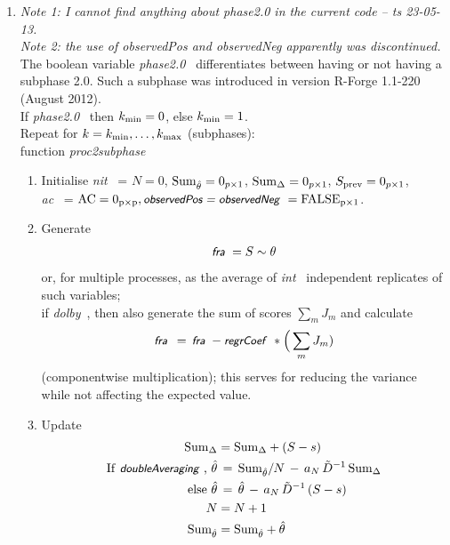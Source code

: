 \documentclass[a4paper,12pt,fleqn]{article}
\newcommand{\nnm}[1]{\textsf{\small\textit{#1}\ }}
\begin{document}
\begin{enumerate}
     In the code, matrix $\hat{D}$ is \nnm{dinv} and $\tilde{D}$ is \nnm{dinvv}.
\item[Phase 2.]
    \emph{Note 1: I cannot find anything about phase2.0 in the current code -- ts 23-05-13.}\\
    \emph{Note 2: the use of observedPos and observedNeg apparently was discontinued.}\\
    The boolean variable \nnm{phase2.0} differentiates between having or not
    having a subphase 2.0.
    Such a subphase was introduced in version R-Forge 1.1-220 (August 2012).\\
    If \nnm{phase2.0} then $k_{\rm{min}} = 0$, else $k_{\rm{min}} = 1$.\\
     Repeat for $k = k_{\rm{min}}, \ldots, k_{\rm{max}}$ (subphases):\\
     function \nnm{proc2subphase}
     \begin{enumerate}
     \item Initialise \nnm{nit} = $N = 0$,
        ${\rm{Sum}}_{\hat\theta} = 0_{p \times 1}$,  ${\rm{Sum}}_\Delta = 0_{p \times 1}$,
        $S_{\rm{prev}} = 0_{p \times 1}$, \\
        \nnm{ac} = $\rm{AC} = 0_{p \times p},
        \nnm{observedPos = observedNeg}  = \text{FALSE}_{p \times 1}$.
     \item Generate
           \[
           \nnm{fra} = S \sim \theta
           \]
           or, for multiple processes, as the average of \nnm{int}
           independent replicates of such variables;\\
           if \nnm{dolby}, then also generate the sum of scores $\sum_m J_m$
           and calculate
           \[
           \nnm{fra} \,=\, \nnm{fra} - \nnm{regrCoef}*\Big(\sum_m J_m)
           \]
           (componentwise multiplication); this serves for reducing the
           variance while not affecting the expected value.
    \item  Update
            \begin{align*}
              {\rm{Sum}}_\Delta & =  {\rm{Sum}}_\Delta + (S-s) \\
             \text{If \nnm{doubleAveraging},}\ \hat{\theta} &\,=\,
               {\rm{Sum}}_{\hat\theta}/N \,-\, a_N\, \tilde{D}^{-1} \, {\rm{Sum}}_\Delta \\
             \text{else}\ \hat{\theta} &\,=\,
               \hat{\theta} \,-\, a_N\, \tilde{D}^{-1} \, (S - s) \\
             N & =  N+1 \\
            {\rm{Sum}}_{\hat\theta} & =  {\rm{Sum}}_{\hat\theta} + \hat\theta \\

\end{align*}
\end{enumerate}
\end{enumerate}
\end{document}
